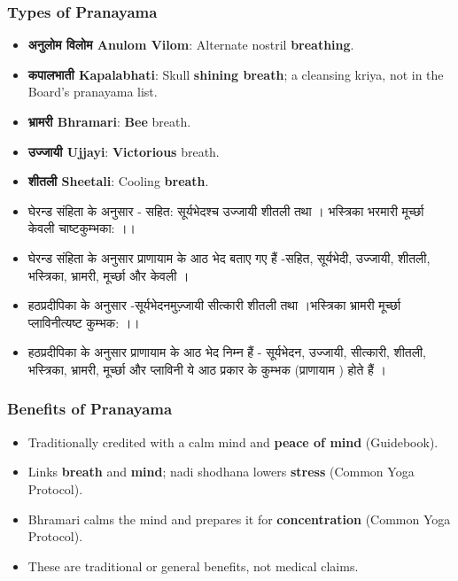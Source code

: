 \begin{frame}[fragile]\frametitle{Types of Pranayama}

      \begin{itemize}
        \item \textbf{अनुलोम विलोम  Anulom Vilom}: Alternate nostril \textbf{breathing}.
        \item \textbf{कपालभाती  Kapalabhati}: Skull \textbf{shining breath}; a cleansing kriya, not in the Board's pranayama list.
        \item \textbf{भ्रामरी Bhramari}: \textbf{Bee} breath.
        \item \textbf{उज्जायी Ujjayi}: \textbf{Victorious} breath.
        \item \textbf{शीतली Sheetali}: Cooling \textbf{breath}.
        \item घेरन्ड संहिता के अनुसार - सहित: सूर्यभेदश्च उज्जायी शीतली तथा । भस्त्रिका भरमारी मूर्च्छा केवली चाष्टकुम्भका: ।।
        \item घेरन्ड संहिता के अनुसार प्राणायाम के आठ भेद बताए गए हैं -सहित, सूर्यभेदी, उज्जायी, शीतली, भस्त्रिका, भ्रामरी, मूर्च्छा और केवली ।
        \item हठप्रदीपिका के अनुसार -सूर्यभेदनमुज़्जायी सीत्कारी शीतली तथा ।भस्त्रिका भ्रामरी मूर्च्छा प्लाविनीत्यष्ट कुम्भक: ।।
        \item हठप्रदीपिका के अनुसार प्राणायाम के आठ भेद निम्न हैं - सूर्यभेदन, उज्जायी, सीत्कारी, शीतली, भस्त्रिका, भ्रामरी, मूर्च्छा और प्लाविनी ये आठ प्रकार के कुम्भक (प्राणायाम ) होते हैं ।
		
      \end{itemize}

\end{frame}

\begin{frame}[fragile]\frametitle{Benefits of Pranayama}
      \begin{itemize}
        \item Traditionally credited with a calm mind and \textbf{peace of mind} (Guidebook).
        \item Links \textbf{breath} and \textbf{mind}; nadi shodhana lowers \textbf{stress} (Common Yoga Protocol).
        \item Bhramari calms the mind and prepares it for \textbf{concentration} (Common Yoga Protocol).

        \item These are traditional or general benefits, not medical claims.
      \end{itemize}

\end{frame}

